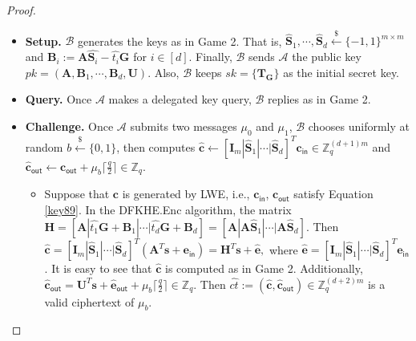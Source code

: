 \documentclass[runningheads,10pt]{llncs}
\begin{document}
\begin{proof}
\begin{description}
\begin{itemize}
			\item \textbf{Setup.}   
			$\mathcal{B}$ generates the keys as in Game 2. 
			That is,  $\widehat{\textbf{S}}_1, \cdots, \widehat{\textbf{S}}_{d} \xleftarrow{\$} \{-1,1\}^{m \times m}$ and 
			$\textbf{B}_i:=\textbf{A}\widehat{\textbf{S}_i}-\widehat{t_i}\textbf{G}$  for $i\in [d]$. 
			Finally, $\mathcal{B}$ sends $\mathcal{A}$ the public key $pk=(\textbf{A}, \textbf{B}_1, \cdots, \textbf{B}_d, \textbf{U})$. Also, $\mathcal{B}$ 
			keeps $sk=\{\textbf{T}_\textbf{G}\}$ as the initial secret key.
			\item \textbf{Query.} Once $\mathcal{A}$ makes a  delegated key query, $\mathcal{B}$ replies as in Game 2.
			\item \textbf{Challenge.} Once $\mathcal{A}$ submits two messages $\mu_0$ and $\mu_1$, $\mathcal{B}$ chooses uniformly at random $b \xleftarrow{\$} \{0,1\}$, then computes 
			$\widehat{\textbf{c}}\leftarrow [\textbf{I}_m|\widehat{\textbf{S}}_1|\cdots|\widehat{\textbf{S}}_{d}]^T\textbf{c}_\textsf{in} \in \mathbb{Z}_q^{(d+1)m}$  and $\widehat{\textbf{c}}_{\textsf{out}} \leftarrow \textbf{c}_{\textsf{out}}+\mu_b \lceil \frac{q}{2} \rceil \in \mathbb{Z}_q$.
			\begin{itemize}
				\item  Suppose that $\textbf{c}$ is generated by LWE, 
				i.e.,  $\textbf{c}_{\textsf{in}}$, $ \textbf{c}_{\textsf{out}}$ satisfy Equation \eqref{key89}. In the \textsf{DFKHE.Enc} algorithm,
				the matrix $\textbf{H}=[\textbf{A}|\widehat{t_1}\textbf{G}+\textbf{B}_1|\cdots |\widehat{t_d} \textbf{G}+\textbf{B}_d]=[\textbf{A}|\textbf{A}\widehat{\textbf{S}}_1|\cdots|\textbf{A}\widehat{\textbf{S}}_d]$. Then 
				$
				\widehat{\textbf{c}}= [\textbf{I}_m|\widehat{\textbf{S}}_1|\cdots|\widehat{\textbf{S}}_{d}]^T(\textbf{A}^T\textbf{s}+\textbf{e}_\textsf{in})=\textbf{H}^T\textbf{s}+\widehat{\textbf{e}}, 
				$
				where $\widehat{\textbf{e}}=[\textbf{I}_m|\widehat{\textbf{S}}_1|\cdots|\widehat{\textbf{S}}_{d}]^T\textbf{e}_\textsf{in}$. 
				It is easy to see that $\widehat{\textbf{c}}$ is computed as in Game 2. 	Additionally, $\widehat{\textbf{c}}_{\textsf{out}} =\textbf{U}^T \textbf{s}+\widehat{\textbf{e}}_{\textsf{out}}+\mu_b \lceil \frac{q}{2} \rceil \in \mathbb{Z}_q$. Then $\widehat{ct}:=(\widehat{\textbf{c}}, \widehat{\textbf{c}}_{\textsf{out}} ) \in \mathbb{Z}_q^{(d+2)m}$ is a valid ciphertext of $\mu_b$. 
				

\end{itemize}
\end{itemize}
\end{description}
\end{proof}
\end{document}
